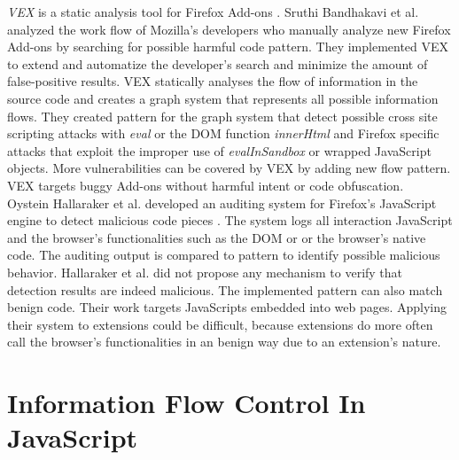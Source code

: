 	\textit{VEX} is a static analysis tool for Firefox Add-ons \cite{Bandhakavi:2011:VBE:1995376.1995398}. Sruthi Bandhakavi et al. analyzed the work flow of Mozilla's developers who manually analyze new Firefox Add-ons by searching for possible harmful code pattern. They implemented VEX to extend and automatize the developer's search and minimize the amount of false-positive results. VEX statically analyses the flow of information in the source code and creates a graph system that represents all possible information flows. They created pattern for the graph system that detect possible cross site scripting attacks with \textit{eval} or the DOM function \textit{innerHtml} and Firefox specific attacks that exploit the improper use of \textit{evalInSandbox} or wrapped JavaScript objects. More vulnerabilities can be covered by VEX by adding new flow pattern. VEX targets buggy Add-ons without harmful intent or code obfuscation. \\
	
	Oystein Hallaraker et al. developed an auditing system for Firefox's JavaScript engine to detect malicious code pieces \cite{Hallaraker:2005:DMJ:1078029.1078861}. The system logs all interaction JavaScript and the browser's functionalities such as the DOM or or the browser's native code. The auditing output is compared to pattern to identify possible malicious behavior. Hallaraker et al. did not propose any mechanism to verify that detection results are indeed malicious. The implemented pattern can also match benign code. Their work targets JavaScripts embedded into web pages. Applying their system to extensions could be difficult, because extensions do more often call the browser's functionalities in an benign way due to an extension's nature. \\
	
	
	
\section{Information Flow Control In JavaScript}
	

